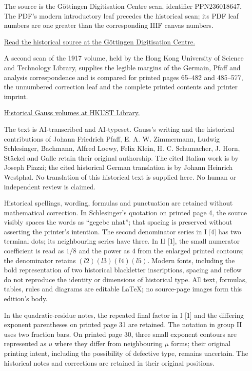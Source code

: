 The source is the Göttingen Digitisation Centre scan, identifier PPN236018647. The PDF's modern introductory leaf precedes the historical scan; its PDF leaf numbers are one greater than the corresponding IIIF canvas numbers.

\noindent\href{https://gdz.sub.uni-goettingen.de/id/PPN236018647}{Read the historical source at the Göttingen Digitisation Centre.}

A second scan of the 1917 volume, held by the Hong Kong University of Science and Technology Library, supplies the legible margins of the Germain, Pfaff and analysis correspondence and is compared for printed pages 65–482 and 485–577, the unnumbered correction leaf and the complete printed contents and printer imprint.

\noindent\href{https://lbezone.hkust.edu.hk/rse/?p=13258}{Historical Gauss volumes at HKUST Library.}

The text is AI-transcribed and AI-typeset. Gauss's writing and the historical contributions of Johann Friedrich Pfaff, E. A. W. Zimmermann, Ludwig Schlesinger, Bachmann, Alfred Loewy, Felix Klein, H. C. Schumacher, J. Horn, Stäckel and Galle retain their original authorship. The cited Italian work is by Joseph Piazzi; the cited historical German translation is by Johann Heinrich Westphal. No translation of this historical text is supplied here. No human or independent review is claimed.

Historical spellings, wording, formulas and punctuation are retained without mathematical correction. In Schlesinger's quotation on printed page 4, the source visibly spaces the words as ``gegebe nhat''; that spacing is preserved without asserting the printer's intention. The second denominator series in I [4] has two terminal dots; its neighbouring series have three. In II [1], the small numerator coefficient is read as $1/8$ and the power as $4$ from the enlarged printed contours; the denominator retains $(l2)(l3)(l4)(l5)$. Modern fonts, including the bold representation of two historical blackletter inscriptions, spacing and reflow do not reproduce the identity or dimensions of historical type. All text, formulas, tables, rules and diagrams are editable LaTeX; no source-page images form this edition's body.

In the quadratic-residue notes, the repeated final factor in I [1] and the differing exponent parentheses on printed page 31 are retained. The notation in group II uses two fraction bars. On printed page 30, three small exponent contours are represented as $u$ where they differ from neighbouring $\mu$ forms; their original printing intent, including the possibility of defective type, remains uncertain. The historical notes and corrections are retained in their original positions.

